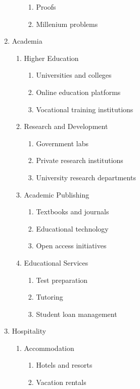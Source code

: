 \begin{enumerate}
\begin{enumerate}
\begin{enumerate}
            \item Proofs
            \item Millenium problems
        \end{enumerate}
    \end{enumerate}
    \item Academia
    \begin{enumerate}
        \item Higher Education
        \begin{enumerate}
            \item Universities and colleges
            \item Online education platforms
            \item Vocational training institutions
        \end{enumerate}
        \item Research and Development
        \begin{enumerate}
            \item Government labs
            \item Private research institutions
            \item University research departments
        \end{enumerate}
        \item Academic Publishing
        \begin{enumerate}
            \item Textbooks and journals
            \item Educational technology
            \item Open access initiatives
        \end{enumerate}
        \item Educational Services
        \begin{enumerate}
            \item Test preparation
            \item Tutoring
            \item Student loan management
        \end{enumerate}
    \end{enumerate}
    \item Hospitality
    \begin{enumerate}
        \item Accommodation
        \begin{enumerate}
            \item Hotels and resorts
            \item Vacation rentals

\end{enumerate}
\end{enumerate}
\end{enumerate}

